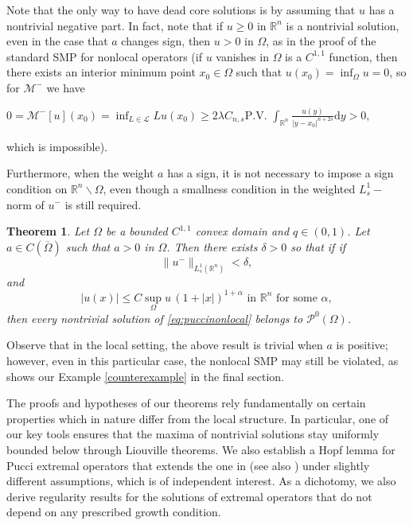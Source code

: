\documentclass[11pt]{article}
\newtheorem{theorem}{Theorem}
\begin{document}
Note that the only way to have dead core solutions is by assuming that $u$ has a nontrivial negative part. In fact, note that if \(u\geq 0\) in \(\mathbb{R}^{n}\) is a nontrivial solution, even in the case that \(a\) changes sign, then \(u>0\) in \(\Omega\), as in the proof of the standard SMP for nonlocal operators (if  $u$ vanishes in $\Omega$ is a $C^{1,1}$ function, then there exists an interior minimum point \(x_{0}\in\Omega\) such that \(u(x_0)=\inf_{\Omega}u=0\), so for $\mathcal{M}^-$ we have
\begin{center}$
   0 = \mathcal{M}^{-}[u](x_0) = \inf_{L\in\mathcal{L}}Lu(x_{0})  
  \ge 2 \lambda  C_{n,s}\text{P.V. }\int_{\mathbb{R}^{n}}\frac{u(y)}{|y-x_0|^{n+2s}}\mathrm{d}y >0,
$\end{center}
which is impossible). 

Furthermore, when the weight \(a\) has a sign, it is not necessary to impose a sign condition on \(\mathbb{R}^{n}\backslash\Omega\), even though a smallness condition in the weighted \(L_{s}^{1}-\)norm of $u^-$ is still required.

\begin{theorem}\label{teo2}
Let $\Omega$ be a bounded $C^{1,1}$ convex domain and $q\in (0,1)$.
Let \(a\in C(\overline{\Omega})\) such that $a> 0$ in $\Omega$.  Then there exists  \(\delta > 0\) so that if 
if 
    $$
    \|u^{-}\|_{L^{1}_{s}(\mathbb{R}^{n})} < \delta,
    $$
    and
$$
    |u(x)|\leq C\sup_\Omega u \,(1+|x|)^{1+\alpha} \mbox{ in }\mathbb{R}^n \textrm{ for some $\alpha$}, 
$$ 
    then every nontrivial solution of \eqref{eq:puccinonlocal} belongs to \(\mathcal{P}^{0}(\Omega)\).
\end{theorem}

Observe that in the local setting, the above result is trivial when \(a\) is positive; however, even in this particular case, the nonlocal SMP may still be violated, as shows our Example \ref{counterexample} in the final section.

The proofs and hypotheses of our theorems rely fundamentally on certain properties which in nature differ from the local structure. 
In particular, one of our key tools ensures that the maxima of nontrivial solutions stay uniformly bounded below through Liouville theorems. 
We also establish a Hopf lemma for Pucci extremal operators that extends the one in \cite{dipierro2024fractional} (see also \cite{DelTP2025, OS2025}) under slightly different assumptions, which is of independent interest. 
As a dichotomy, we also derive regularity results for the solutions of extremal operators that do not depend on any prescribed growth condition. 
\end{document}
